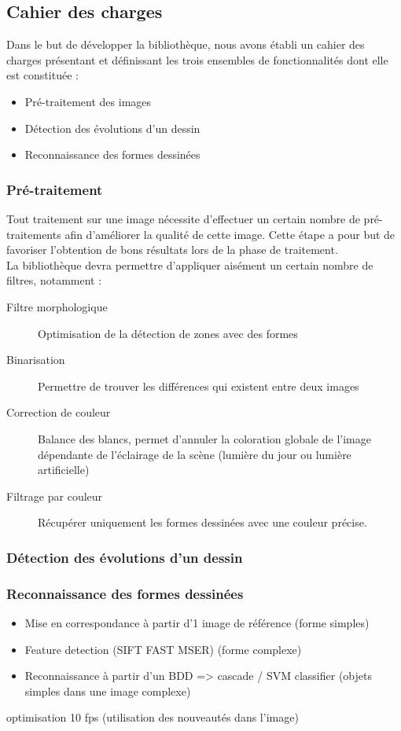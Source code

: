 \subsection{Cahier des charges}

Dans le but de développer la bibliothèque, nous avons établi un cahier des charges présentant et définissant les trois ensembles de fonctionnalités dont elle est constituée :
\begin{itemize}
\item Pré-traitement des images
\item Détection des évolutions d'un dessin
\item Reconnaissance des formes dessinées
\end{itemize}

\subsubsection{Pré-traitement}

Tout traitement sur une image nécessite d'effectuer un certain nombre de pré-traitements afin d'améliorer la qualité de cette image. Cette étape a pour but de favoriser l'obtention de bons résultats lors de la phase de traitement.\\

La bibliothèque devra permettre d'appliquer aisément un certain nombre de filtres, notamment :

\begin{description}
\item[Filtre morphologique] Optimisation de la détection de zones avec des formes
\item[Binarisation] Permettre de trouver les différences qui existent entre deux images
\item[Correction de couleur] Balance des blancs, permet d'annuler la coloration globale de l'image dépendante de l'éclairage de la scène (lumière du jour ou lumière artificielle)
\item[Filtrage par couleur] Récupérer uniquement les formes dessinées avec une couleur précise.
\end{description}


\subsubsection{Détection des évolutions d'un dessin}



\subsubsection{Reconnaissance des formes dessinées}
\begin{itemize}
\item Mise en correspondance à partir d’1 image de référence (forme simples)
\item Feature detection (SIFT FAST MSER) (forme complexe)
\item Reconnaissance à partir d’un BDD => cascade / SVM classifier (objets simples dans une image complexe)
\end{itemize}
optimisation 10 fps (utilisation des nouveautés dans l’image)


